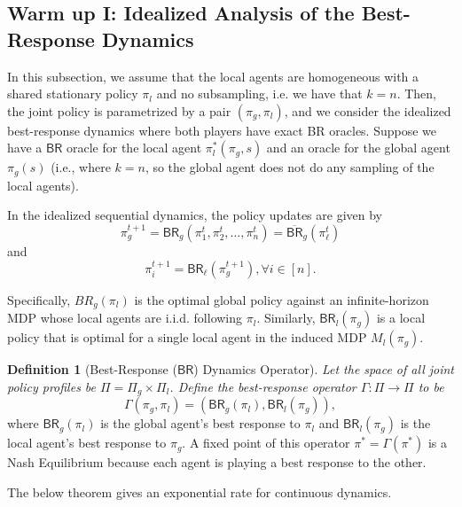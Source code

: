 \documentclass{article}
\theoremstyle{plain}
\theoremstyle{definition}
\newtheorem{definition}[theorem]{Definition}
\begin{document}
\subsection{Warm up I: Idealized Analysis of the Best-Response Dynamics} 

\label{subsec: idealized analysis}

In this subsection, we assume that the local agents are homogeneous with a shared stationary policy $\pi_l$ and no subsampling, i.e. we have that $k=n$. 
Then, the joint policy is parametrized by a pair $(\pi_g, \pi_l)$, and we consider the idealized best-response dynamics where both players have exact BR oracles.
 Suppose we have a $\mathsf{BR}$ oracle for the local agent $\pi_l^*(\pi_g,s)$ and an oracle for the global agent $\pi_g(s)$ (i.e., where $k=n$, so the global agent does not do any sampling of the local agents).
 
 In the idealized sequential dynamics, the policy updates are given by \begin{equation}\pi_g^{t+1} = \mathsf{BR}_g(\pi_1^t, \pi_2^t, \dots, \pi_n^t) = \overline{\mathsf{BR}}_g(\pi_\ell^t)\end{equation} and \begin{equation} \pi_i^{t+1} = \mathsf{BR}_\ell(\pi_g^{t+1}), \forall i\in[n].\end{equation}
 
 Specifically, $BR_g(\pi_l)$ is the optimal global policy against an infinite-horizon MDP whose local agents are i.i.d. following $\pi_l$. Similarly, $\mathsf{BR}_l(\pi_g)$ is a local policy that is optimal for a single local agent in the induced MDP $M_l(\pi_g)$.\\


\begin{definition}[Best-Response ($\mathsf{BR}$) Dynamics Operator] \emph{Let the space of all joint policy profiles be $\Pi = \Pi_g\times\Pi_l$. Define the best-response operator $\Gamma:\Pi\to \Pi$ to be} \begin{equation}\Gamma(\pi_g, \pi_l) = (\mathsf{BR}_g(\pi_l), \mathsf{BR}_l(\pi_g)),\end{equation}
where $\mathsf{BR}_g(\pi_l)$ is the global agent's best response to $\pi_l$ and $\mathsf{BR}_l(\pi_g)$ is the local agent's best response to $\pi_g$. A fixed point of this operator $\pi^* = \Gamma(\pi^*)$ is a Nash Equilibrium because each agent is playing a best response to the other.
\end{definition}


The below theorem gives an exponential rate for continuous dynamics.
\end{document}
